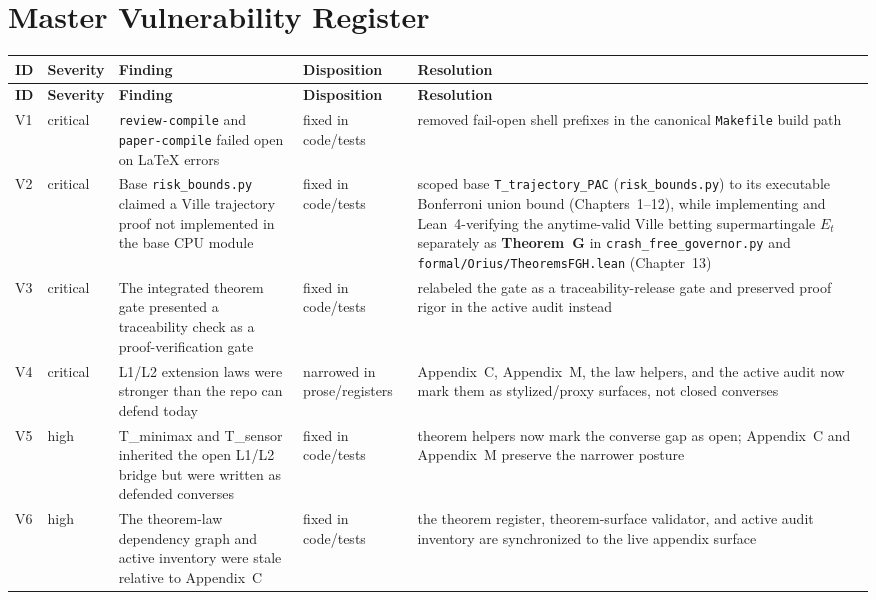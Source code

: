 \section{Master Vulnerability Register}

\begin{longtable}{p{}p{}p{}p{}p{}}
\toprule
\textbf{ID} & \textbf{Severity} & \textbf{Finding} & \textbf{Disposition} & \textbf{Resolution} \\
\midrule
\endfirsthead
\toprule
\textbf{ID} & \textbf{Severity} & \textbf{Finding} & \textbf{Disposition} & \textbf{Resolution} \\
\midrule
\endhead
V1 & critical & \texttt{review-compile} and \texttt{paper-compile} failed open on LaTeX errors & fixed in code/tests & removed fail-open shell prefixes in the canonical \texttt{Makefile} build path \\
V2 & critical & Base \texttt{risk\_bounds.py} claimed a Ville trajectory proof not implemented in the base CPU module & fixed in code/tests & scoped base \texttt{T\_\allowbreak trajectory\_\allowbreak PAC} (\texttt{risk\_\allowbreak bounds.py}) to its executable Bonferroni union bound (Chapters~1--12), while implementing and Lean~4-verifying the anytime-valid Ville betting supermartingale $E_t$ separately as \textbf{Theorem~G} in \texttt{crash\_\allowbreak free\_\allowbreak governor.py} and \texttt{formal/\allowbreak Orius/\allowbreak TheoremsFGH.lean} (Chapter~13) \\
V3 & critical & The integrated theorem gate presented a traceability check as a proof-verification gate & fixed in code/tests & relabeled the gate as a traceability-release gate and preserved proof rigor in the active audit instead \\
V4 & critical & L1/L2 extension laws were stronger than the repo can defend today & narrowed in prose/registers & Appendix~C, Appendix~M, the law helpers, and the active audit now mark them as stylized/proxy surfaces, not closed converses \\
V5 & high & T\_minimax and T\_sensor inherited the open L1/L2 bridge but were written as defended converses & fixed in code/tests & theorem helpers now mark the converse gap as open; Appendix~C and Appendix~M preserve the narrower posture \\
V6 & high & The theorem-law dependency graph and active inventory were stale relative to Appendix~C & fixed in code/tests & the theorem register, theorem-surface validator, and active audit inventory are synchronized to the live appendix surface \\

\end{longtable}
